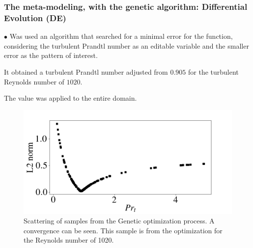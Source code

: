 \documentclass[xcolor=dvipsnames,8pt,aspectratio=34]{beamer}
\begin{document}
	
		\begin{frame}
		\frametitle{The meta-modeling, with the genetic algorithm: Differential Evolution (DE)}
		\begin{minipage}[h!]{0.35\textwidth}
			$\bullet$ Was used an algorithm that searched for a minimal error for the function, considering the turbulent Prandtl number as an editable variable and the smaller error as the pattern of interest.
			
			It obtained a turbulent Prandtl number adjusted from $ 0.905 $ for the turbulent Reynolds number of $ 1020$.
			
			The value was applied to the entire domain.
		\end{minipage}
			\begin{minipage}[h!]{0.3\textwidth}
			\end{minipage}
			\begin{minipage}[h!]{0.55\textwidth}
			\begin{figure}
				\centering
				\includegraphics[angle=0, scale=0.3]{fotos_formatacao_final/Genetic_amostra}
				\caption{Scattering of samples from the Genetic optimization process. A convergence can be seen. This sample is from the optimization for the Reynolds number of 1020.}
			\end{figure}
		\end{minipage}	
		\end{frame}
		
		
		
		
		
\end{document}
